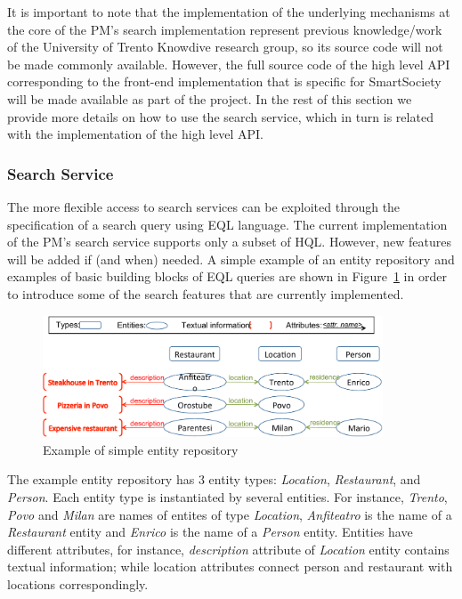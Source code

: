 It is important to note that the implementation of the underlying mechanisms at the core of the PM's search implementation represent previous knowledge/work of the University of Trento Knowdive research group, so its source code will not be made commonly available. However, the full source code of the high level API corresponding to the front-end implementation that is specific for SmartSociety will be made available as part of the project. In the rest of this section we provide more details on how to use the search service, which in turn is related with the implementation of the high level API. 

\subsubsection{Search Service}

The more flexible access to search services can be exploited through the specification of a search query using EQL language. The current implementation of the PM's search service supports only a subset of HQL. However, new features will be added if (and when) needed. A simple example of an entity repository and examples of basic building blocks of EQL queries are shown in Figure~\ref{fig:search_example} in order to introduce some of the search features that are currently implemented. 

\begin{figure}[htbp]
\centering
\includegraphics[width=0.90\textwidth]{figures/searchExample}
\caption{Example of simple entity repository}
\label{fig:search_example}
\end{figure}

The example entity repository has 3 entity types: \emph{Location}, \emph{Restaurant}, and \emph{Person}. Each entity type is instantiated by several entities. For instance, \emph{Trento}, \emph{Povo} and \emph{Milan} are names of entites of type \emph{Location}, \emph{Anfiteatro} is the name of a \emph{Restaurant} entity and \emph{Enrico} is the name of a \emph{Person} entity. Entities have different attributes, for instance, \emph{description} attribute of \emph{Location} entity contains textual information; while location attributes connect person and restaurant with locations correspondingly.

